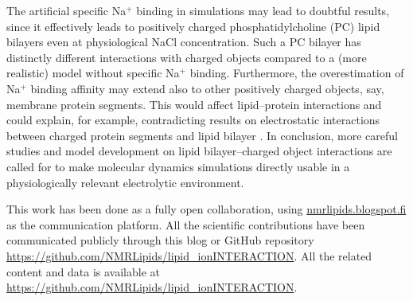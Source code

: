 \documentclass[twoside,twocolumn,9pt]{article}
\begin{document}
The artificial specific Na$^+$ binding in simulations may lead to doubtful results, since it effectively leads  to
positively charged phosphatidylcholine (PC) lipid bilayers even at physiological NaCl concentration.
Such a PC bilayer has distinctly different interactions with charged objects compared to a (more realistic)
model without specific Na$^+$ binding. Furthermore, the overestimation of Na$^+$ binding affinity may
extend also to other positively charged objects, say, membrane protein segments. This would affect
lipid--protein interactions and could explain, for example, contradicting results on electrostatic interactions 
between charged protein segments and lipid bilayer \cite{arkhipov13,kaszuba15}. In conclusion, 
more careful studies and model development on lipid bilayer--charged object interactions are
called for to make molecular dynamics simulations directly usable in a physiologically relevant
electrolytic environment. 


This work has been done as a fully open collaboration, using
\url{nmrlipids.blogspot.fi} as the communication platform. All the
scientific contributions have been communicated publicly through
this blog or GitHub repository \url{https://github.com/NMRLipids/lipid_ionINTERACTION}.
All the related content and data is available at \url{https://github.com/NMRLipids/lipid_ionINTERACTION}.

\end{document}
